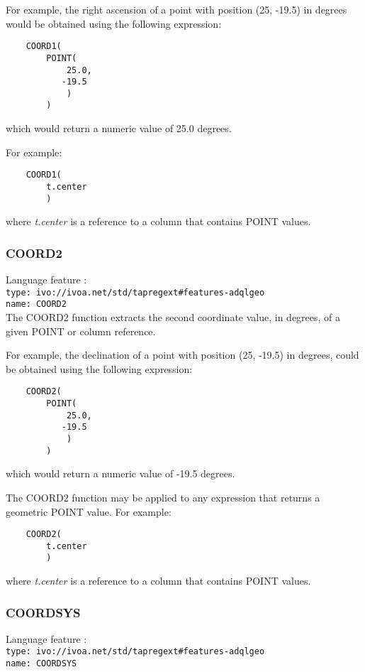 \documentclass[11pt,a4paper]{ivoa}
\begin{document}
For example, the right ascension of a point with position (25, -19.5) in
degrees would be obtained using the following expression:
\begin{verbatim}
    COORD1(
        POINT(
            25.0,
           -19.5
            )
        )
\end{verbatim}
\noindent
which would return a numeric value of 25.0 degrees.

For example:
\begin{verbatim}
    COORD1(
        t.center
        )
\end{verbatim}
\noindent
where \textit{t.center} is a reference to a column that contains POINT values.

\subsubsection{COORD2}
\label{sec:functions.geom.coord2}
{\footnotesize Language feature :}\\
{\footnotesize \verb|type: ivo://ivoa.net/std/tapregext#features-adqlgeo|}\\
{\footnotesize \verb|name: COORD2|}\\

The COORD2 function extracts the second coordinate value, in degrees, of a given
POINT  or column reference.

For example, the declination of a point with position (25, -19.5) in degrees,
could be obtained using the following expression:
\begin{verbatim}
    COORD2(
        POINT(
            25.0,
           -19.5
            )
        )
\end{verbatim}
\noindent
which would return a numeric value of -19.5 degrees.

The COORD2 function may be applied to any expression that returns a
geometric POINT value.
For example:
\begin{verbatim}
    COORD2(
        t.center
        )
\end{verbatim}
\noindent
where \textit{t.center} is a reference to a column that contains POINT values.

\subsubsection{COORDSYS}
\label{sec:functions.geom.coordsys}
{\footnotesize Language feature :}\\
{\footnotesize \verb|type: ivo://ivoa.net/std/tapregext#features-adqlgeo|}\\
{\footnotesize \verb|name: COORDSYS|}\\
\end{document}
